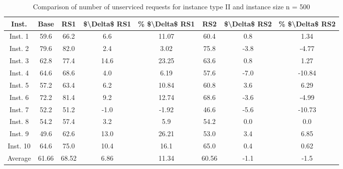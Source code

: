 \begin{table}[H]
\centering
\begin{tabular}{cccccccc}
  \hline
  \textbf{Inst.} & \textbf{Base} & \textbf{RS1} & \textbf{\$\textbackslash{}Delta\$  RS1} & \textbf{\% \$\textbackslash{}Delta\$  RS1} & \textbf{RS2} & \textbf{\$\textbackslash{}Delta\$  RS2} & \textbf{\% \$\textbackslash{}Delta\$  RS2} \\\hline
  Inst. 1 & 59.6 & 66.2 & 6.6 & 11.07 & 60.4 & 0.8 & 1.34 \\
  Inst. 2 & 79.6 & 82.0 & 2.4 & 3.02 & 75.8 & -3.8 & -4.77 \\
  Inst. 3 & 62.8 & 77.4 & 14.6 & 23.25 & 63.6 & 0.8 & 1.27 \\
  Inst. 4 & 64.6 & 68.6 & 4.0 & 6.19 & 57.6 & -7.0 & -10.84 \\
  Inst. 5 & 57.2 & 63.4 & 6.2 & 10.84 & 60.8 & 3.6 & 6.29 \\
  Inst. 6 & 72.2 & 81.4 & 9.2 & 12.74 & 68.6 & -3.6 & -4.99 \\
  Inst. 7 & 52.2 & 51.2 & -1.0 & -1.92 & 46.6 & -5.6 & -10.73 \\
  Inst. 8 & 54.2 & 57.4 & 3.2 & 5.9 & 54.2 & 0.0 & 0.0 \\
  Inst. 9 & 49.6 & 62.6 & 13.0 & 26.21 & 53.0 & 3.4 & 6.85 \\
  Inst. 10 & 64.6 & 75.0 & 10.4 & 16.1 & 65.0 & 0.4 & 0.62 \\
  Average & 61.66 & 68.52 & 6.86 & 11.34 & 60.56 & -1.1 & -1.5 \\\hline
\end{tabular}
\caption{Comparison of number of unserviced requests for instance type II and instance size n = 500}
\label{tab:wait:resrelocation-nTaxi-comparison_II_500}
\end{table}
